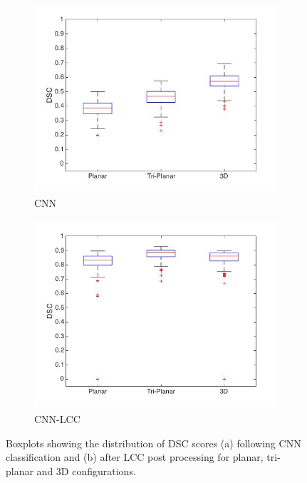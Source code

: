 \documentclass[11pt,a4paper]{memoir}
\numberwithin{figure}{section}
\numberwithin{table}{section}
\numberwithin{equation}{section}
\begin{document}
\begin{figure}[!h]
\begin{adjustwidth}{-1.5cm}{}
\begin{subfigure}{0.6\textwidth}
\includegraphics[width=1.1\linewidth, height=7cm]{boxcnn.jpg} 
\caption{CNN}
\label{fig:CNND}
\end{subfigure}
\begin{subfigure}{0.6\textwidth}
\includegraphics[width=1.1\linewidth, height=7cm]{boxlcc.jpg}
\caption{CNN-LCC}
\label{fig:LCCD}
\end{subfigure}
 \end{adjustwidth}
\caption[Boxplots showing the distribution of DSC scores for each CNN architecture]{Boxplots showing the distribution of DSC scores (a) following CNN classification and (b) after LCC post processing for planar, tri-planar and 3D configurations.}
\label{table:boxy}
\end{figure}
\end{document}
